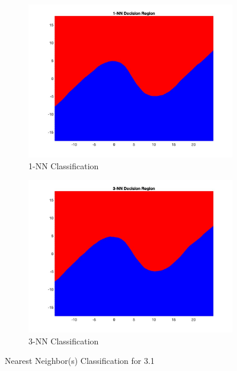 \documentclass[12pt]{article}
\begin{document}
\begin{figure}[H]
\centering
\begin{subfigure}{.5\textwidth}
  \centering
   \includegraphics[scale = 0.22]{6.jpg}
  \caption{1-NN Classification}
  \label{fig:6}
\end{subfigure}%
\begin{subfigure}{.5\textwidth}
  \centering
   \includegraphics[scale = 0.22]{7.jpg}
  \caption{3-NN Classification}
  \label{fig:7}
\end{subfigure}
\caption{Nearest Neighbor(s) Classification for 3.1}
\label{fig:test}
\end{figure}
\end{document}
